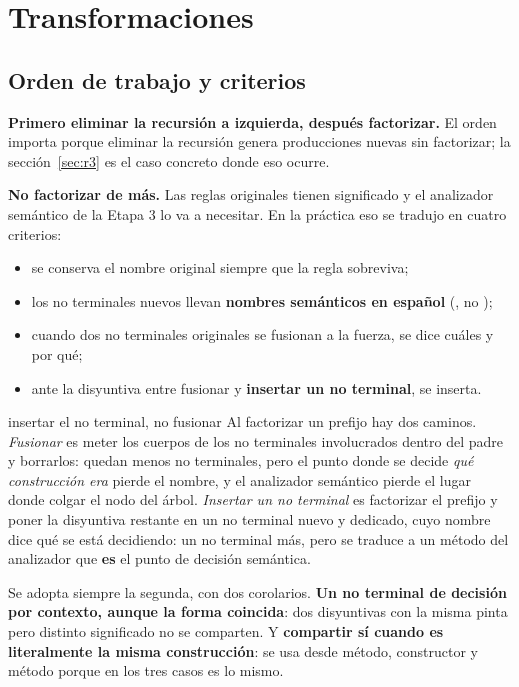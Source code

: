 \section{Transformaciones}
\label{sec:transformaciones}

\subsection{Orden de trabajo y criterios}

\textbf{Primero eliminar la recursión a izquierda, después factorizar.} El orden importa porque
eliminar la recursión genera producciones nuevas sin factorizar; la
sección~\ref{sec:r3} es el caso concreto donde eso ocurre.

\textbf{No factorizar de más.} Las reglas originales tienen significado y el analizador semántico
de la Etapa 3 lo va a necesitar. En la práctica eso se tradujo en cuatro criterios:

\begin{itemize}
  \item se conserva el nombre original siempre que la regla sobreviva;
  \item los no terminales nuevos llevan \textbf{nombres semánticos en español}
        (, no );
  \item cuando dos no terminales originales se fusionan a la fuerza, se dice cuáles y por qué;
  \item ante la disyuntiva entre fusionar y \textbf{insertar un no terminal}, se inserta.
\end{itemize}

\begin{decision}{insertar el no terminal, no fusionar}
Al factorizar un prefijo hay dos caminos. \emph{Fusionar} es meter los cuerpos de los no terminales
involucrados dentro del padre y borrarlos: quedan menos no terminales, pero el punto donde se
decide \emph{qué construcción era} pierde el nombre, y el analizador semántico pierde el lugar
donde colgar el nodo del árbol. \emph{Insertar un no terminal} es factorizar el prefijo y poner la
disyuntiva restante en un no terminal nuevo y dedicado, cuyo nombre dice qué se está decidiendo:
un no terminal más, pero se traduce a un método del analizador que \textbf{es} el punto de decisión
semántica.

Se adopta siempre la segunda, con dos corolarios. \textbf{Un no terminal de decisión por contexto,
aunque la forma coincida}: dos disyuntivas con la misma pinta pero distinto significado no se
comparten. Y \textbf{compartir sí cuando es literalmente la misma construcción}: 
se usa desde método, constructor y método  porque en los tres casos es lo mismo.
\end{decision}

